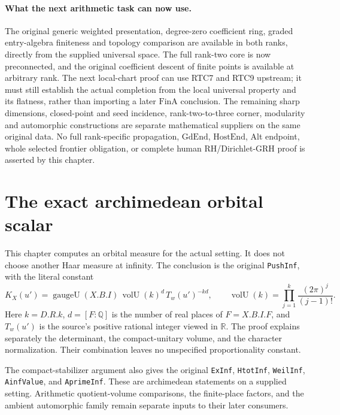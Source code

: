 \documentclass[11pt,a4paper]{article}
\numberwithin{equation}{section}
\theoremstyle{remark}\newtheorem{remark}[theorem]{Remark}
\begin{document}
\paragraph{What the next arithmetic task can now use.}
The original generic weighted presentation, degree-zero coefficient
ring, graded entry-algebra finiteness and topology comparison are
available in both ranks, directly from the supplied universal space.
The full rank-two core is now preconnected, and the original
coefficient descent of finite points is available at arbitrary rank.
The next local-chart proof can use RTC7 and RTC9 upstream; it must
still establish the actual completion from the local universal
property and its flatness, rather than importing a later
\(\mathrm{FinA}\) conclusion.  The remaining sharp dimensions,
closed-point and seed incidence, rank-two-to-three corner, modularity
and automorphic constructions are separate mathematical suppliers on
the same original data.  No full rank-specific propagation,
\(\mathrm{GdEnd}\), \(\mathrm{HostEnd}\), Alt endpoint,
whole selected frontier obligation, or complete human RH/Dirichlet-GRH
proof is asserted by this chapter.


\section{The exact archimedean orbital scalar}
\label{sec:archimedean-orbital-scalar-v54}

This chapter computes an orbital measure for the actual setting.  It
does not choose another Haar measure at infinity.  The conclusion is
the original \texttt{Push\allowbreak Inf}, with the literal constant
\[
 K_X(u')=\operatorname{gaugeU}(X.B.I)\,
       \operatorname{volU}(k)^d\,T_w(u')^{-kd},
 \qquad
 \operatorname{volU}(k)=\prod_{j=1}^{k}\frac{(2\pi)^j}{(j-1)!}.
 \tag{AOS.1}
\]
Here $k=D.R.k$, $d=[F:\mathbb Q]$ is the number of real places of
$F=X.B.I.F$, and $T_w(u')$ is the source's positive rational integer
viewed in $\mathbb R$.  The proof explains separately the determinant,
the compact-unitary volume, and the character normalization.  Their
combination leaves no unspecified proportionality constant.

The compact-stabilizer argument also gives the original
\texttt{Ex\allowbreak Inf}, \texttt{Htot\allowbreak Inf}, \texttt{Weil\allowbreak Inf},
\texttt{Ainf\allowbreak Value}, and \texttt{Aprime\allowbreak Inf}.  These are archimedean
statements on a supplied setting.  Arithmetic quotient-volume
comparisons, the finite-place factors, and the ambient automorphic
family remain separate inputs to their later consumers.
\end{document}
